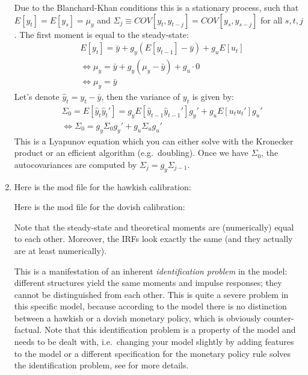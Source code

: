 \begin{enumerate}
Due to the Blanchard-Khan conditions this is a stationary process,
  such that $E[y_t] = E[y_s] = \mu_y$ and $\Sigma_{j} \equiv COV[y_t,y_{t-j}] = COV[y_{s}, y_{s-j}]$ for all $s,t,j$.
The first moment is equal to the steady-state:
\begin{align*}
&E [y_t] = \bar{y} + g_y (E [y_{t-1}] - \bar{y}) + g_u E [u_t]
\\
&\Leftrightarrow \mu_y = \bar{y} + g_y(\mu_y - \bar{y}) + g_u \cdot 0
\\
&\Leftrightarrow \mu_y = \bar{y}
\end{align*}
Let's denote $\hat{y}_t = y_t - \bar{y}$, then the variance of $y_t$ is given by:
\begin{align*}
&\Sigma_0 = E[\hat{y}_t \hat{y}_t'] = g_y E[\hat{y}_{t-1} \hat{y}_{t-1}'] g_y' + g_u E[u_t u_t'] g_u'
\\
&\Leftrightarrow \Sigma_0 = g_y \Sigma_0 g_y' + g_u \Sigma_u g_u'
\end{align*}
This is a Lyapunov equation which you can either solve with the Kronecker product or an efficient algorithm (e.g.\ doubling).
Once we have $\Sigma_0$, the autocovariances are computed by $\Sigma_j = g_y \Sigma_{j-1}$.

\item Here is the mod file for the hawkish calibration:


Here is the mod file for the dovish calibration:


Note that the steady-state and theoretical moments are (numerically) equal to each other.
Moreover, the IRFs look exactly the same (and they actually are at least numerically).

This is a manifestation of an inherent \emph{identification problem} in the model:
  different structures yield the same moments and impulse responses;
  they cannot be distinguished from each other.
This is quite a severe problem in this specific model,
  because according to the model there is no distinction between a hawkish or a dovish monetary policy,
  which is obviously counter-factual.
Note that this identification problem is a property of the model
  and needs to be dealt with, i.e.\ changing your model slightly by adding features to the model
  or a different specification for the monetary policy rule
  solves the identification problem, see \textcite{Ivashchenko.Mutschler_2020_EffectObservablesFunctionala} for more details.


\end{enumerate}
